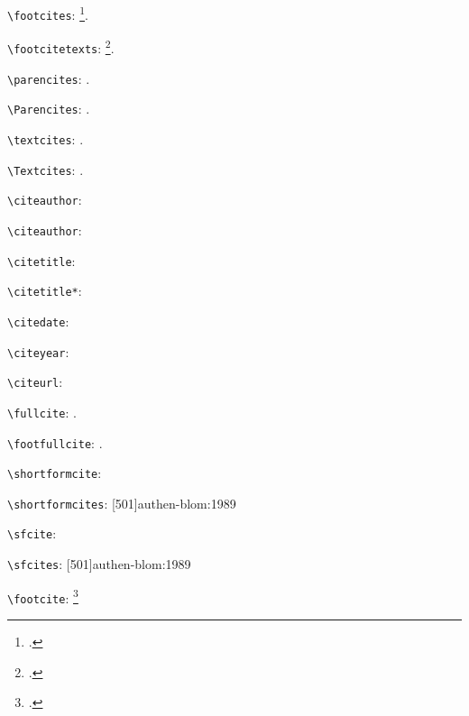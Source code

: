 \documentclass[a4paper,12pt]{scrartcl}
\newcommand{\Befehl}[1]{\texttt{\textbackslash#1}}
\begin{document}
\begin{itemize}
    \item\Befehl{footcites}: \footcites[68]{auler:hiller:2011}[48]{auler:hiller:2015a}[159--187]{auler:hiller:2015}[40--41]{auler:hiller:2016}[15--23]{tacitus:1981}[19]{de:neck:yoder:1978}.
	\item\Befehl{footcitetexts}: \footcitetexts[68]{auler:hiller:2011}[48]{auler:hiller:2015a}[159--187]{auler:hiller:2015}[40--41]{auler:hiller:2016}[15--23]{tacitus:1981}[19]{de:neck:yoder:1978}.
	\item\Befehl{parencites}: \parencites[68]{auler:hiller:2011}[48]{auler:hiller:2015a}[159--187]{auler:hiller:2015}[40--41]{auler:hiller:2016}[15--23]{tacitus:1981}[19]{de:neck:yoder:1978}.
	\item\Befehl{Parencites}: \Parencites[68]{auler:hiller:2011}[48]{auler:hiller:2015a}[159--187]{auler:hiller:2015}[40--41]{auler:hiller:2016}[15--23]{tacitus:1981}[19]{de:neck:yoder:1978}.
	\item\Befehl{textcites}: \textcites[68]{auler:hiller:2011}[48]{auler:hiller:2015a}[159--187]{auler:hiller:2015}[40--41]{auler:hiller:2016}[15--23]{tacitus:1981}[19]{de:neck:yoder:1978}.
	\item\Befehl{Textcites}: \Textcites[68]{auler:hiller:2011}[48]{auler:hiller:2015a}[159--187]{auler:hiller:2015}[40--41]{auler:hiller:2016}[15--23]{tacitus:1981}[19]{de:neck:yoder:1978}.
	\item\Befehl{citeauthor}: \citeauthor{auler:hiller:2015}
	\item\Befehl{citeauthor}: 
	\item\Befehl{citetitle}: 
	\item\Befehl{citetitle*}: 
	\item\Befehl{citedate}: 
	\item\Befehl{citeyear}: \citeyear{auler:hiller:2015}
	\item\Befehl{citeurl}: 
	\item\Befehl{fullcite}: .
	\item\Befehl{footfullcite}: .
    {\item\Befehl{shortformcite}: %
    \item\Befehl{shortformcites}: [501]{authen-blom:1989}%
    \item\Befehl{sfcite}: %
    \item\Befehl{sfcites}: [501]{authen-blom:1989}}%
    {}
    \item\Befehl{footcite}: \footcites{auler:hiller:2015}{harsdoerffer:1656}
\end{itemize}
\end{document}
